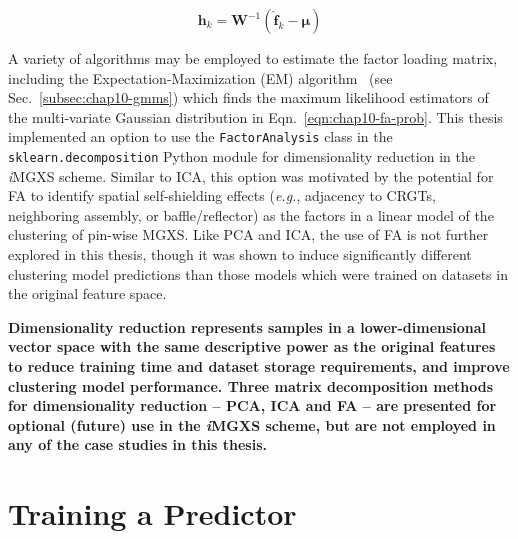 \begin{equation}
\label{eqn:chap10-fa-inverse}
\boldsymbol{h}_{k} = \boldsymbol{W}^{-1}\left(\boldsymbol{\hat{f}}_{k} - \boldsymbol{\mu}\right)
\end{equation}

A variety of algorithms may be employed to estimate the factor loading matrix, including the Expectation-Maximization (EM) algorithm~\cite{dempster1977em} (see Sec.~\ref{subsec:chap10-gmms}) which finds the maximum likelihood estimators of the multi-variate Gaussian distribution in Eqn.~\ref{eqn:chap10-fa-prob}. This thesis implemented an option to use the \texttt{FactorAnalysis} class in the \texttt{sklearn.decomposition} Python module for dimensionality reduction in the \textit{i}\ac{MGXS} scheme. Similar to ICA, this option was motivated by the potential for FA to identify spatial self-shielding effects (\textit{e.g.}, adjacency to \acp{CRGT}, neighboring assembly, or baffle/reflector) as the factors in a linear model of the clustering of pin-wise \ac{MGXS}. Like PCA and ICA, the use of FA is not further explored in this thesis, though it was shown to induce significantly different clustering model predictions than those models which were trained on datasets in the original feature space.

\clearpage

\begin{emphbox}
\textbf{Dimensionality reduction represents samples in a lower-dimensional vector space with the same descriptive power as the original features to reduce training time and dataset storage requirements, and improve clustering model performance. Three matrix decomposition methods for dimensionality reduction -- PCA, ICA and FA -- are presented for optional (future) use in the \textit{i}\ac{MGXS} scheme, but are not employed in any of the case studies in this thesis.}
\end{emphbox}



\section{Training a Predictor}
\label{sec:chap10-train-predictor}

